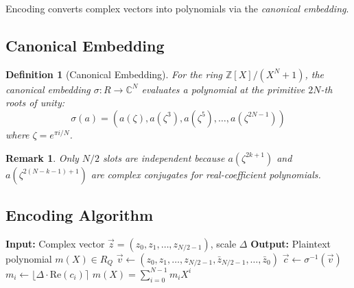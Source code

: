 \documentclass[11pt,a4paper]{article}
\newtheorem{definition}{Definition}
\newtheorem{remark}{Remark}
\newcommand{\Z}{\mathbb{Z}}
\begin{document}
Encoding converts complex vectors into polynomials via the \emph{canonical embedding}.

\subsection{Canonical Embedding}

\begin{definition}[Canonical Embedding]
For the ring $\Z[X]/(X^N + 1)$, the canonical embedding $\sigma: R \to \mathbb{C}^N$ evaluates a polynomial at the primitive $2N$-th roots of unity:
\[
\sigma(a) = (a(\zeta), a(\zeta^3), a(\zeta^5), \ldots, a(\zeta^{2N-1}))
\]
where $\zeta = e^{\pi i / N}$.
\end{definition}

\begin{remark}
Only $N/2$ slots are independent because $a(\zeta^{2k+1})$ and $a(\zeta^{2(N-k-1)+1})$ are complex conjugates for real-coefficient polynomials.
\end{remark}

\subsection{Encoding Algorithm}

\begin{algorithm}[H]
\caption{CKKS Encoding}
\begin{algorithmic}[1]
    \State \textbf{Input:} Complex vector $\vec{z} = (z_0, z_1, \ldots, z_{N/2-1})$, scale $\Delta$
    \State \textbf{Output:} Plaintext polynomial $m(X) \in R_Q$
    \State
    \State {}
    \State $\vec{v} \gets (z_0, z_1, \ldots, z_{N/2-1}, \bar{z}_{N/2-1}, \ldots, \bar{z}_0)$
    \State
    \State {}
    \State $\vec{c} \gets \sigma^{-1}(\vec{v})$
    \State
    \State {}
        \State $m_i \gets \lfloor \Delta \cdot \text{Re}(c_i) \rceil$
    \EndFor
    \State
    \State \Return $m(X) = \sum_{i=0}^{N-1} m_i X^i$
\EndFunction
\end{algorithmic}
\end{algorithm}
\end{document}
